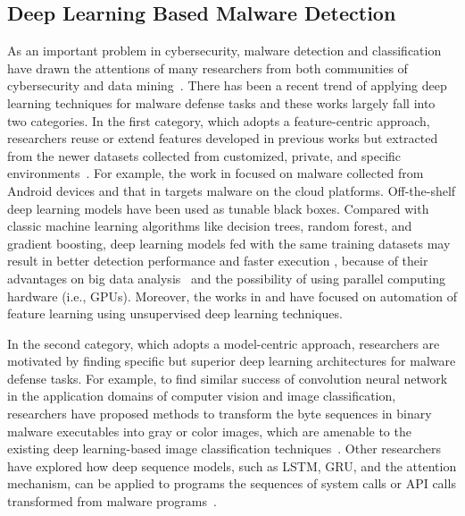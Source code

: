 \subsection{Deep Learning Based Malware Detection}
As an important problem in cybersecurity, malware detection and classification have drawn the attentions of many researchers from both communities of cybersecurity and data mining~\cite{MalDetectSurvey1, MalDetectSurvey2}.
There has been a recent trend of applying deep learning techniques for malware defense tasks and these works largely fall into two categories.
In the first category, which adopts a feature-centric approach, researchers reuse or extend features developed in previous works but extracted from the newer datasets collected from customized, private, and specific environments~\cite{EarlyStageRnn, DeepFlow, DeepAM, RandomProjectionNn, AutoEncoderFeatureLearn, AutoEncoderMicrosoft, LstmSyscall, MalwareLstmGru}.
For example, the work in \cite{DeepFlow} focused on malware collected from Android devices and that in \cite{DeepAM} targets malware on the cloud platforms.
Off-the-shelf deep learning models have been used as tunable black boxes.
Compared with classic machine learning algorithms like decision trees, random forest, and gradient boosting,
deep learning models fed with the same training datasets may result in better detection performance \cite{DeepFlow,RandomProjectionNn} and faster execution \cite{EarlyStageRnn},
because of their advantages on big data analysis~\cite{RandomProjectionNn} and the possibility of using parallel computing hardware (i.e., GPUs).
Moreover, the works in \cite{AutoEncoderFeatureLearn} and \cite{AutoEncoderMicrosoft} have focused on automation of feature learning using unsupervised deep learning techniques.

In the second category, which adopts a model-centric approach, researchers are motivated by finding specific but superior deep learning architectures for malware defense tasks.
For example, to find similar success of convolution neural network in the application domains of computer vision and image classification, researchers have proposed methods to transform the byte sequences in binary malware executables into gray or color images, which are amenable to the existing deep learning-based image classification techniques~\cite{R2D2, GibertCnn}. Other researchers have explored how deep sequence models, such as LSTM, GRU, and the attention mechanism, can be applied to programs the sequences of system calls or API calls transformed from malware programs~\cite{LstmSyscall,MalwareLstmGru}. 

